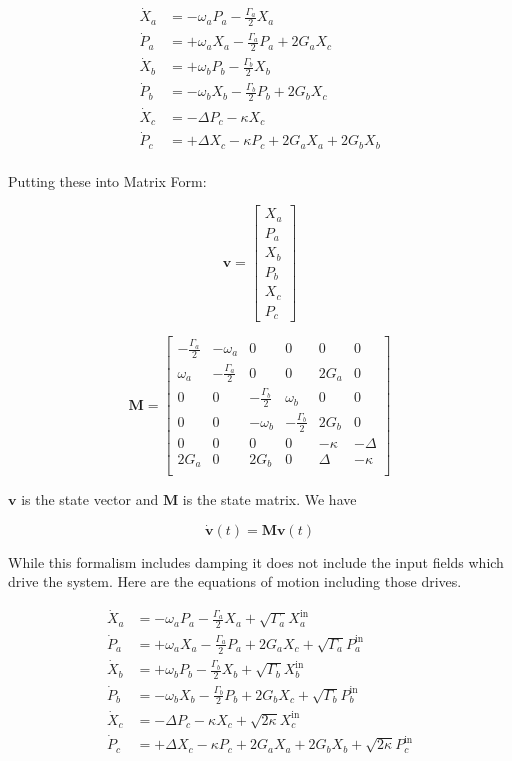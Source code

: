 \documentclass[12pt]{article}
\newcommand{\bv}[1]{\boldsymbol{#1}}
\begin{document}
\begin{align*}
\dot{X}_a &= -\omega_a P_a -\frac{\Gamma_a}{2} X_a\\
\dot{P}_a &= +\omega_a X_a -\frac{\Gamma_a}{2} P_a + 2 G_a X_c\\
\dot{X}_b &= +\omega_b P_b -\frac{\Gamma_b}{2} X_b\\
\dot{P}_b &= -\omega_b X_b -\frac{\Gamma_b}{2} P_b + 2 G_b X_c\\
\dot{X}_c &= -\Delta P_c - \kappa X_c\\
\dot{P}_c &= +\Delta X_c - \kappa P_c + 2 G_a X_a + 2 G_b X_b\\
\end{align*}

Putting these into Matrix Form:

\[ \bv{v} = \begin{bmatrix}
X_a\\P_a\\X_b\\P_b\\X_c\\P_c \end{bmatrix} \]

\[ \bv{M} = \begin{bmatrix}
-\frac{\Gamma_a}{2} & -\omega_a & 0 & 0 & 0 & 0 \\
\omega_a & -\frac{\Gamma_a}{2} & 0 & 0 & 2G_a & 0 \\
0 & 0 & -\frac{\Gamma_b}{2} & \omega_b & 0 & 0 \\
0 & 0 & -\omega_b & -\frac{\Gamma_b}{2} & 2G_b & 0\\
0 & 0 & 0 & 0 & -\kappa & -\Delta \\
2G_a & 0 & 2G_b & 0 & \Delta & -\kappa \\ \end{bmatrix}\]

$\bv{v}$ is the state vector and $\bv{M}$ is the state matrix. We have

\begin{equation}
\dot{\bv{v}}(t) = \bv{M}\bv{v}(t)
\end{equation}

While this formalism includes damping it does not include the input fields which drive the system. 
Here are the equations of motion including those drives.

\begin{align*}
\dot{X}_a &= -\omega_a P_a -\frac{\Gamma_a}{2} X_a + \sqrt{\Gamma_a}X_a^{\text{in}}\\
\dot{P}_a &= +\omega_a X_a -\frac{\Gamma_a}{2} P_a + 2 G_a X_c + \sqrt{\Gamma_a}P_a^{\text{in}}\\
\dot{X}_b &= +\omega_b P_b -\frac{\Gamma_b}{2} X_b + \sqrt{\Gamma_b}X_b^{\text{in}}\\
\dot{P}_b &= -\omega_b X_b -\frac{\Gamma_b}{2} P_b + 2 G_b X_c + \sqrt{\Gamma_b}P_b^{\text{in}}\\
\dot{X}_c &= -\Delta P_c - \kappa X_c + \sqrt{2\kappa}X_c^{\text{in}}\\
\dot{P}_c &= +\Delta X_c - \kappa P_c + 2 G_a X_a + 2 G_b X_b + \sqrt{2\kappa}P_c^{\text{in}}\\
\end{align*}
\end{document}
